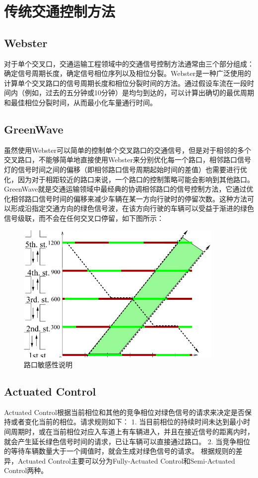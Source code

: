 \section{传统交通控制方法}
\subsection{Webster}
对于单个交叉口，交通运输工程领域中的交通信号控制方法通常由三个部分组成：确定信号周期长度，确定信号相位序列以及相位分裂。Webster是一种广泛使用的计算单个交叉路口的信号周期长度和相位分裂时间的方法。通过假设车流在一段时间内（例如，过去的五分钟或10分钟）是均匀到达的，可以计算出确切的最优周期和最佳相位分裂时间，从而最小化车量通行时间。

\subsection{GreenWave}
虽然使用Webster可以简单的控制单个交叉路口的交通信号，但是对于相邻的多个交叉路口，不能够简单地直接使用Webster来分别优化每一个路口，相邻路口信号灯的信号时间之间的偏移（即相邻路口信号周期起始时间的差值）也需要进行优化，因为对于相距较近的路口来说，一个路口的控制策略可能会影响到其他路口。
GreenWave就是交通运输领域中最经典的协调相邻路口的信号控制方法，它通过优化相邻路口信号时间的偏移来减少车辆在某一方向行驶时的停留次数。这种方法可以形成沿指定交通方向的绿色信号波，在该方向行驶的车辆可以受益于渐进的绿色信号级联，而不会在任何交叉口停留，如下图所示：
\begin{figure}[htb]
    \includegraphics[width=10cm]{fig/GreenWave.jpg}
    \caption{路口敏感性说明}
    \label{fig:green-wave}
\end{figure}

\subsection{Actuated Control}
Actuated Control根据当前相位和其他的竞争相位对绿色信号的请求来决定是否保持或者变化当前的相位。请求规则如下：
1. 当目前相位的持续时间未达到最小时间周期时，或在当前相位对应入车道上有车辆进入，并且在接近信号的距离内时，就会产生延长绿色信号时间的请求，已让车辆可以直接通过路口。 
2. 当竞争相位的等待车辆数量大于一个阈值时，就会生成对绿色信号的请求。
根据规则的差异，Actuated Control主要可以分为Fully-Actuated Control和Semi-Actuated Control两种。

